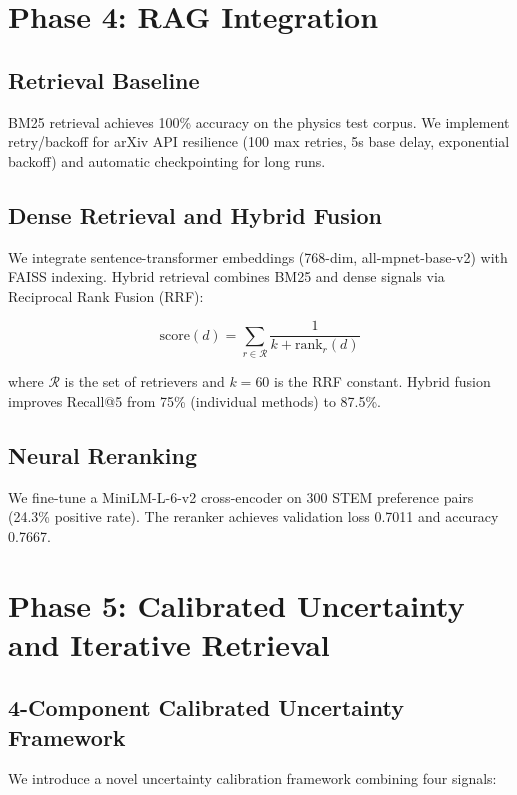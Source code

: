 \documentclass[11pt,a4paper]{article}
\begin{document}
\section{Phase 4: RAG Integration}

\subsection{Retrieval Baseline}

BM25 retrieval achieves 100\% accuracy on the physics test corpus. We implement retry/backoff for arXiv API resilience (100 max retries, 5s base delay, exponential backoff) and automatic checkpointing for long runs.

\subsection{Dense Retrieval and Hybrid Fusion}

We integrate sentence-transformer embeddings (768-dim, all-mpnet-base-v2) with FAISS indexing. Hybrid retrieval combines BM25 and dense signals via Reciprocal Rank Fusion (RRF):

\begin{equation}
\text{score}(d) = \sum_{r \in \mathcal{R}} \frac{1}{k + \text{rank}_r(d)}
\end{equation}

where $\mathcal{R}$ is the set of retrievers and $k=60$ is the RRF constant. Hybrid fusion improves Recall@5 from 75\% (individual methods) to 87.5\%.

\subsection{Neural Reranking}

We fine-tune a MiniLM-L-6-v2 cross-encoder on 300 STEM preference pairs (24.3\% positive rate). The reranker achieves validation loss 0.7011 and accuracy 0.7667.

\section{Phase 5: Calibrated Uncertainty and Iterative Retrieval}

\subsection{4-Component Calibrated Uncertainty Framework}

We introduce a novel uncertainty calibration framework combining four signals:
\end{document}
